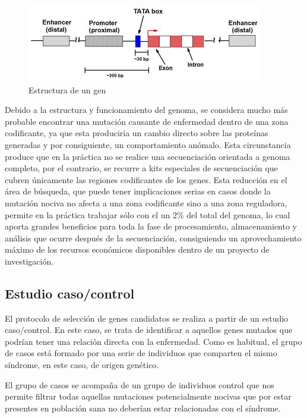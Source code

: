 \medskip
\begin{figure}
\centering
\includegraphics[scale=1]{images/estructura_gen.jpeg} 
\caption{Estructura de un gen}
\end{figure}

\medskip
Debido a la estructura y funcionamiento del genoma, se considera mucho más probable encontrar una mutación causante de enfermedad dentro de una zona codificante, ya que esta produciría un cambio directo sobre las proteínas generadas y por consiguiente, un comportamiento anómalo. Esta circunstancia produce que en la práctica no se realice una secuenciación orientada a genoma completo, por el contrario, se recurre a kits especiales de secuenciación que cubren únicamente las regiones codificantes de los genes. Esta reducción en el área de búsqueda, que puede tener implicaciones serias en casos donde la mutación nociva no afecta a una zona codificante sino a una zona reguladora, permite en la práctica trabajar sólo con el un 2\% del total del genoma, lo cual aporta grandes beneficios para toda la fase de procesamiento, almacenamiento y análisis que ocurre después de la secuenciación, consiguiendo un aprovechamiento máximo de los recursos económicos disponibles dentro de un proyecto de investigación. 

\subsection{Estudio caso/control}

El protocolo de selección de genes candidatos se realiza a partir de un estudio caso/control. En este caso, se trata de identificar a aquellos genes mutados que podrían tener una relación directa con la enfermedad. Como es habitual, el grupo de casos está formado por una serie de individuos que comparten el mismo síndrome, en este caso, de origen genético. 

\medskip
El grupo de casos se acompaña de un grupo de individuos control que nos permite filtrar todas aquellas mutaciones potencialmente nocivas que por estar presentes en población sana no deberían estar relacionadas con el síndrome. 

